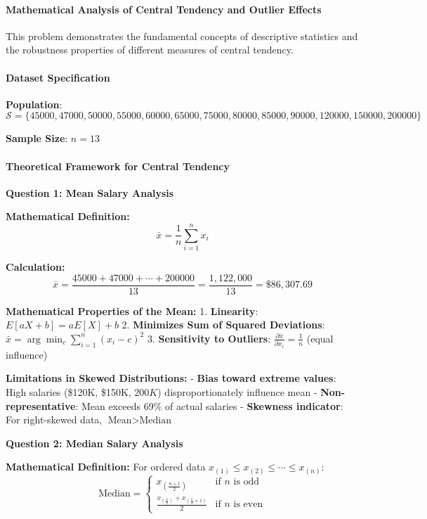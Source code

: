 \documentclass[11pt]{article}
\begin{document}
\paragraph{Mathematical Analysis of Central Tendency and Outlier
Effects}\label{mathematical-analysis-of-central-tendency-and-outlier-effects}

This problem demonstrates the fundamental concepts of descriptive
statistics and the robustness properties of different measures of
central tendency.

\paragraph{Dataset Specification}\label{dataset-specification}

\textbf{Population}:
\(\mathcal{S} = \{45000, 47000, 50000, 55000, 60000, 65000, 75000, 80000, 85000, 90000, 120000, 150000, 200000\}\)

\textbf{Sample Size}: \(n = 13\)

\paragraph{Theoretical Framework for Central
Tendency}\label{theoretical-framework-for-central-tendency}

\textbf{Question 1: Mean Salary Analysis}

\textbf{Mathematical Definition:}
\[\bar{x} = \frac{1}{n}\sum_{i=1}^{n} x_i\]

\textbf{Calculation:}
\[\bar{x} = \frac{45000 + 47000 + \cdots + 200000}{13} = \frac{1,122,000}{13} = \$86,307.69\]

\textbf{Mathematical Properties of the Mean:} 1. \textbf{Linearity}:
\(E[aX + b] = aE[X] + b\) 2. \textbf{Minimizes Sum of Squared
Deviations}: \(\bar{x} = \arg\min_c \sum_{i=1}^{n}(x_i - c)^2\) 3.
\textbf{Sensitivity to Outliers}:
\(\frac{\partial \bar{x}}{\partial x_i} = \frac{1}{n}\) (equal
influence)

\textbf{Limitations in Skewed Distributions:} - \textbf{Bias toward
extreme values}: High salaries (\$120K, \$150K, \(200K\))
disproportionately influence mean - \textbf{Non-representative}: Mean
exceeds 69\% of actual salaries - \textbf{Skewness indicator}: For
right-skewed data, \(\text{Mean} > \text{Median}\)

\textbf{Question 2: Median Salary Analysis}

\textbf{Mathematical Definition:} For ordered data
\(x_{(1)} \leq x_{(2)} \leq \cdots \leq x_{(n)}\):
\[\text{Median} = \begin{cases} 
x_{(\frac{n+1}{2})} & \text{if } n \text{ is odd} \\
\frac{x_{(\frac{n}{2})} + x_{(\frac{n}{2}+1)}}{2} & \text{if } n \text{ is even}
\end{cases}\]
\end{document}
